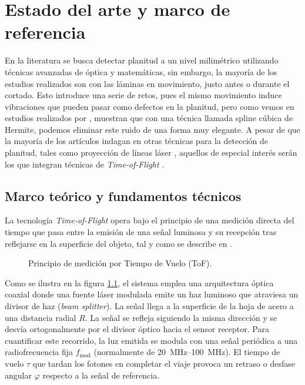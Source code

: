 
\chapter{Estado del arte y marco de referencia}
En la literatura se busca detectar planitud a un nivel milimétrico utilizando técnicas avanzadas de óptica y matemáticas, sin embargo, la mayoría de los estudios realizados son con las láminas en movimiento, justo antes o durante el cortado.
Esto introduce una serie de retos, pues el mismo movimiento induce vibraciones que pueden pasar como defectos en la planitud, pero como vemos en estudios realizados por \textcite{Alonso2020, Alonso2021}, muestran que con una técnica llamada spline cúbica de Hermite, podemos eliminar este ruido de una forma muy elegante.
A pesar de que la mayoría de los artículos indagan en otras técnicas para la detección de planitud, tales como proyección de líneas láser \parencite{Molleda2011, Alonso2020, Alonso2021, Tsai2021, Zhu2026}, aquellos de especial interés serán los que integran técnicas de \textit{Time-of-Flight} \parencite{Lange2001, Du2026, Yoshida2026}.

\section{Marco teórico y fundamentos técnicos}
La tecnología \textit{Time-of-Flight} opera bajo el principio de una medición directa del tiempo que pasa entre la emisión de una señal luminosa y su recepción tras reflejarse en la superficie del objeto, tal y como se describe en \textcite{Lange2001}.

\begin{figure}[ht]
	\centering
	
	\caption{Principio de medición por Tiempo de Vuelo (ToF).}
	\label{fig:tof_scheme}
\end{figure}
Como se ilustra en la figura \ref{fig:tof_scheme}, el sistema emplea una arquitectura óptica coaxial donde una fuente láser modulada emite un haz luminoso que atraviesa un divisor de haz (\textit{beam splitter}).
La señal llega a la superficie de la hoja de acero a una distancia radial \(R\).
La señal se refleja siguiendo la misma dirección y se desvía ortogonalmente por el divisor óptico hacia el sensor receptor.
Para cuantificar este recorrido, la luz emitida se modula con una señal periódica a una radiofrecuencia fija \(f_{\text{mod}}\) (normalmente de \qtyrange{20}{100}{\mega\hertz}).
El tiempo de vuelo \(\tau\) que tardan los fotones en completar el viaje provoca un retraso o desfase angular \(\varphi\) respecto a la señal de referencia.

